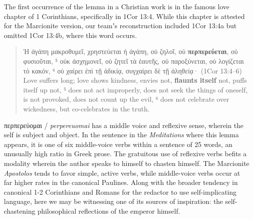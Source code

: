 The first occurrence of the lemma in a Christian work is in the famous love chapter %
of 1 Corinthians, specifically in 1Cor 13:4. %
While this chapter is attested for the Marcionite version, %
our teamʼs reconstruction included 1Cor 13:4a but omitted 1Cor 13:4b, where this word occurs. %

\vspace*{2mm} 
 \begin{quote}Ἡ ἀγάπη μακροθυμεῖ, χρηστεύεται ἡ ἀγάπη, %
 οὐ ζηλοῖ, οὐ \textbf{περπερεύεται}, οὐ φυσιοῦται, %
 ⁵ οὐκ ἀσχημονεῖ, οὐ ζητεῖ τὰ ἑαυτῆς, %
 οὐ παροξύνεται, οὐ λογίζεται τὸ κακόν, %
 ⁶ οὐ χαίρει ἐπὶ τῇ ἀδικίᾳ, συγχαίρει δὲ τῇ ἀληθείᾳ· (1Cor 13:4--6) \\[1mm] %
 Love suffers long; love shows kindness, %
 envies not, \textbf{flaunts itself} not, puffs itself up not, %
 ⁵ does not act improperly, does not seek the things of oneself, %
 is not provoked, does not count up the evil, %
 ⁶ does not celebrate over wickedness, but co-celebrates in the truth. %
 \end{quote} %
\vspace*{2mm}

περπερεύομαι / \textit{perpereuomai} has a middle voice and reflexive sense, wherein the self is subject and object. %
In the sentence in the \textit{Meditations} where this lemma appears, %
it is one of six middle-voice verbs within a sentence of 25 words, %
an unusually high ratio in Greek prose. %
The gratuitous use of reflexive verbs befits a modality wherein the author speaks to himself to chasten himself. %
The Marcionite \textit{Apostolos} tends to favor simple, active verbs, %
while middle-voice verbs occur at far higher rates in the canonical Paulines. %
Along with the broader tendency in canonical 1-2 Corinthians and Romans %
for the redactor to use self-implicating language, %
here we may be witnessing one of its sources of inspiration: %
the self-chastening philosophical reflections of the emperor himself. %

